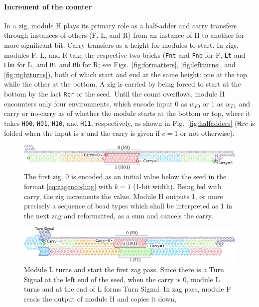 \documentclass[twocolumn]{svjour3}
\begin{document}
\paragraph{Increment of the counter}
In a zig, module H plays its primary role as a half-adder and carry transfers through instances of others (F, L, and R) from an instance of H to another for more significant bit.
Carry transfers as a height for modules to start.
In zigs, modules F, L, and R take the respective two bricks (\texttt{Fnt} and \texttt{Fnb} for F, \texttt{Lt} and \texttt{Lbn} for L, and \texttt{Rt} and \texttt{Rb} for R; see Figs.~\ref{fig:formatters}, \ref{fig:leftturns}, and \ref{fig:rightturns}), both of which start and end at the same height: one at the top while the other at the bottom.
A zig is carried by being forced to start at the bottom by the last \texttt{Rcr} or the seed.
Until the count overflows, module H encounters only four environments, which encode input 0 as $w_{F0}$ or 1 as $w_{F1}$ and carry or no-carry as of whether the module starts at the bottom or top, where it takes \texttt{H00}, \texttt{H01}, \texttt{H10}, and \texttt{H11}, respectively, as shown in Fig.~\ref{fig:halfadders} (\texttt{H}$xc$ is folded when the input is $x$ and the carry is given if $c=1$ or not otherwise).

\begin{figure}[tb]
\centering
\includegraphics[width=\linewidth]{fig/svg/CounterEx5_1.pdf}
\caption{
The first zig.
0 is encoded as an initial value below the seed in the format \eqref{eq:zagencoding} with $k = 1$ (1-bit width).
Being fed with carry, the zig increments the value.
Module H outputs 1, or more precisely a sequence of bead types which shall be interpreted as 1 in the next zag and reformatted, as a sum and cancels the carry.
}

\label{fig:counter1stzig}
\end{figure}

\begin{figure}[tb]
\centering
\includegraphics[width=\linewidth]{fig/svg/CounterEx11_1.pdf}
\caption{
Module L turns and start the first zag pass.
Since there is a Turn Signal at the left end of the seed, when the carry is 0, module L turns and at the end of L forms Turn Signal.
In zag pass, module F reads the output of module H and copies it down,
}
\label{fig:counter1stzag}
\end{figure}
\end{document}
